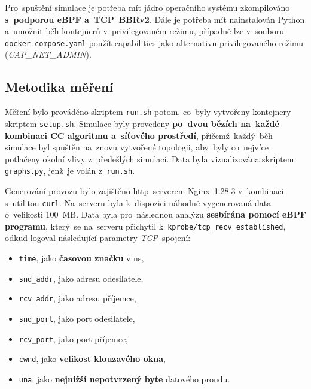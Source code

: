 \documentclass[a4paper,11pt]{article}
\begin{document}
Pro~spuštění simulace je potřeba mít jádro operačního systému zkompilováno
\textbf{s~podporou eBPF a~TCP~BBRv2}. Dále je potřeba mít nainstalován Python a~umožnit běh kontejnerů v~privilegovaném režimu,
případně lze v~souboru \verb|docker-compose.yaml| použít capabilities jako alternativu privilegovaného režimu (\textit{CAP\_NET\_ADMIN}).

\subsection{Metodika měření}
Měření bylo prováděno skriptem \verb|run.sh| potom, co~byly vytvořeny kontejnery skriptem \verb|setup.sh|.
Simulace byly provedeny \textbf{po~dvou bězích na~každé kombinaci CC algoritmu a~síťového prostředí}, přičemž~každý~běh simulace byl spuštěn na~znovu vytvořené topologii,
aby~byly co~nejvíce potlačeny okolní vlivy z~předešlých simulací. Data byla vizualizována skriptem \verb|graphs.py|, jenž~je volán z~\verb|run.sh|.

Generování provozu bylo zajištěno http~serverem Nginx~1.28.3 v~kombinaci s~utilitou \verb|curl|. Na~serveru byla k~dispozici náhodně vygenerovaná data o~velikosti 100~MB.
Data byla pro~následnou analýzu \textbf{sesbírána pomocí eBPF programu}, který~se na~serveru přichytil k~\verb|kprobe/tcp_recv_established|, odkud logoval následující parametry \textit{TCP}~spojení:
\begin{itemize}
	\item{\verb|time|, jako \textbf{časovou značku} v ns,}
	\item{\verb|snd_addr|, jako adresu odesilatele,}
	\item{\verb|rcv_addr|, jako adresu příjemce,}
	\item{\verb|snd_port|, jako port odesilatele,}
	\item{\verb|rcv_port|, jako port příjemce,}
	\item{\verb|cwnd|, jako \textbf{velikost klouzavého okna},}
	\item{\verb|una|, jako \textbf{nejnižší nepotvrzený byte} datového proudu.}
\end{itemize}
\end{document}
